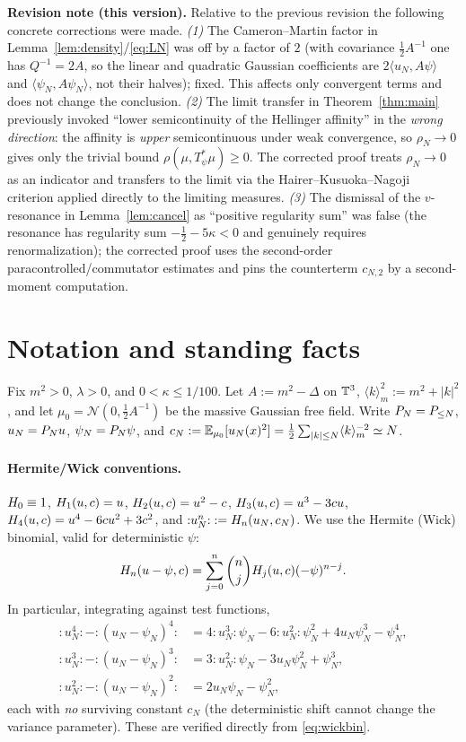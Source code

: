 \medskip
\noindent\textbf{Revision note (this version).} Relative to the previous revision the
following concrete corrections were made. \emph{(1)} The Cameron--Martin factor in
Lemma~\ref{lem:density}/\eqref{eq:LN} was off by a factor of $2$ (with covariance
$\tfrac12A^{-1}$ one has $Q^{-1}=2A$, so the linear and quadratic Gaussian coefficients
are $2\langle u_N,A\psi\rangle$ and $\langle\psi_N,A\psi_N\rangle$, not their halves);
fixed. This affects only convergent terms and does not change the conclusion.
\emph{(2)} The limit transfer in Theorem~\ref{thm:main} previously invoked
``lower semicontinuity of the Hellinger affinity'' in the \emph{wrong direction}: the
affinity is \emph{upper} semicontinuous under weak convergence, so $\rho_N\to0$ gives only
the trivial bound $\rho(\mu,T_\psi^*\mu)\ge0$. The corrected proof treats $\rho_N\to0$ as
an indicator and transfers to the limit via the Hairer--Kusuoka--Nagoji criterion
\cite{HKN24} applied directly to the limiting measures. \emph{(3)} The dismissal of the
$v$-resonance in Lemma~\ref{lem:cancel} as ``positive regularity sum'' was false (the
resonance has regularity sum $-\tfrac12-5\kappa<0$ and genuinely requires
renormalization); the corrected proof uses the second-order paracontrolled/commutator
estimates and pins the counterterm $c_{N,2}$ by a second-moment computation.

\section*{Notation and standing facts}

Fix $m^2>0$, $\lambda>0$, and $0<\kappa\le 1/100$. Let $A:=m^2-\Delta$ on $\mathbb{T}^3$,
$\langle k\rangle_m^2:=m^2+|k|^2$, and let $\mu_0=\mathcal N(0,\tfrac12A^{-1})$ be the
massive Gaussian free field. Write $P_N=P_{\le N}$, $u_N=P_N u$,
$\psi_N=P_N\psi$, and
$c_N:=\mathbb{E}_{\mu_0}[u_N(x)^2]=\tfrac12\sum_{|k|\le N}\langle k\rangle_m^{-2}\simeq N$.

\paragraph{Hermite/Wick conventions.}
$H_0\equiv1$, $H_1(u,c)=u$, $H_2(u,c)=u^2-c$, $H_3(u,c)=u^3-3cu$,
$H_4(u,c)=u^4-6cu^2+3c^2$, and ${:}u_N^n{:}:=H_n(u_N,c_N)$. We use the
Hermite (Wick) binomial, valid for deterministic $\psi$:
\begin{equation}\label{eq:wickbin}
H_n(u-\psi,c)=\sum_{j=0}^n\binom njH_j(u,c)(-\psi)^{n-j}.
\end{equation}
In particular, integrating against test functions,
\begin{align}
{:}u_N^4{:}-{:}(u_N-\psi_N)^4{:}&=4{:}u_N^3{:}\psi_N-6{:}u_N^2{:}\psi_N^2+4u_N\psi_N^3-\psi_N^4,\label{eq:diff4}\\
{:}u_N^3{:}-{:}(u_N-\psi_N)^3{:}&=3{:}u_N^2{:}\psi_N-3u_N\psi_N^2+\psi_N^3,\label{eq:diff3}\\
{:}u_N^2{:}-{:}(u_N-\psi_N)^2{:}&=2u_N\psi_N-\psi_N^2,\label{eq:diff2}
\end{align}
each with \emph{no} surviving constant $c_N$ (the deterministic shift cannot change the
variance parameter). These are verified directly from \eqref{eq:wickbin}.

